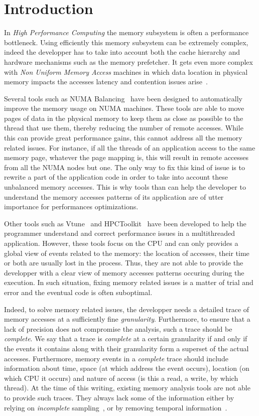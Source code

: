 \section{Introduction}
\label{sec:intro}

In \emph{High Performance Computing} the memory subsystem is often a performance bottleneck.
Using efficiently this memory subsystem can be extremely
complex, indeed the developper has to take into account both the cache hierarchy and
hardware mechanisms such as the memory prefetcher. It gets even more complex with
\emph{Non Uniform Memory Access} machines in which data location in
physical memory impacts the accesses latency and contention issues arise~\cite{Drepper07What}.

Several tools such as NUMA Balancing~\cite{Corbet2012} have been designed to automatically improve the
memory usage on NUMA machines. These tools are able to move pages of data in the
physical memory to keep them as close as possible to the thread that use them, thereby
reducing the number of remote accesses. While this can provide great performance gains,
this cannot address all the memory related issues. For instance, if all the
threads of an application access to the same memory page, whatever the page mapping is,
this will result in remote accesses from all the NUMA nodes but one. The only way to fix
this kind of issue is to rewrite a part of the application code in order to take into account these
unbalanced memory accesses. This is why tools than can help the developer to understand the memory accesses patterns
of its application are of utter importance for performances optimizations.

Other tools such as Vtune~\cite{Reinders05VTune} and
HPCToolkit~\cite{Adhianto10HPCTOOLKIT} have been developed to help the programmer
understand and correct performance issues in a multithreaded application. However, these tools
focus on the CPU and can only provides a global view of events related to the memory: the location of accesses,
their time or both are usually lost in the process. Thus, they are not able to provide the developper with
a clear view of memory accesses patterns occuring during the execution. In such situation, fixing
memory related issues is a matter of trial and error and the eventual code is often suboptimal.

Indeed, to solve memory related issues, the developper needs a detailed trace of memory
accesses at a sufficiently fine \emph{granularity}. Furthermore, to ensure that a lack of precision
does not compromise the analysis, such a trace should be \emph{complete}. We say that a trace is
\emph{complete} at a certain granularity if and only if the events it contains along with their granularity
form a superset of the actual accesses. Furthermore, memory events in a \emph{complete} trace should
include information about time, space (at which address the event occurs),
location (on which CPU it occurs) and nature of access (is this
a read, a write, by which thread).
%
At the time of this writing, existing memory analysis tools are not able to provide such traces. They
always lack some of the information either by relying on \emph{incomplete}
sampling~\cite{Liu14Tool,Lachaize12MemProf}, or by
removing temporal information~\cite{Beniamine15TABARNACRR}.


